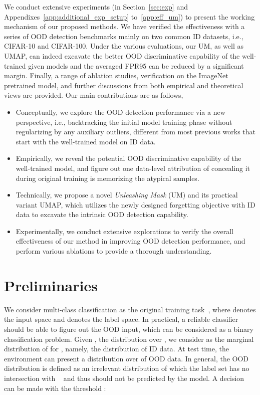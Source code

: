 \documentclass{article}
\theoremstyle{plain}
\theoremstyle{definition}
\theoremstyle{remark}
\begin{document}
We conduct extensive experiments (in Section~\ref{sec:exp} and Appendixes~\ref{app:additional_exp_setup} to~\ref{app:eff_um}) to present the working mechanism of our proposed methods. We have verified the effectiveness with a series of OOD detection benchmarks mainly on two common ID datasets, i.e., CIFAR-10 and CIFAR-100. Under the various evaluations, our UM, as well as UMAP, can indeed excavate the better OOD discriminative capability of the well-trained given models and the averaged FPR95 can be reduced by a significant margin. Finally, a range of ablation studies, verification on the ImageNet pretrained model, and further discussions from both empirical and theoretical views are provided. Our main contributions are as follows,
\begin{itemize}
    \item Conceptually, we explore the OOD detection performance via a new perspective, i.e., backtracking the initial model training phase without regularizing by any auxiliary outliers, different from most previous works that start with the well-trained model on ID data.
    \item Empirically, we reveal the potential OOD discriminative capability of the well-trained model, and figure out one data-level attribution of concealing it during original training is memorizing the atypical samples.
    \item Technically, we propose a novel \textit{Unleashing Mask} (UM) and its practical variant UMAP, which utilizes the newly designed forgetting objective with ID data to excavate the intrinsic OOD detection capability. 
\item Experimentally, we conduct extensive explorations to verify the overall effectiveness of our method in improving OOD detection performance, and perform various ablations to provide a thorough understanding. \end{itemize}






\section{Preliminaries}

We consider multi-class classification as the original training task~\citep{Nguyen_2015_CVPR}, where  denotes the input space and  denotes the label space. In practical, a reliable classifier should be able to figure out the OOD input, which can be considered as a binary classification problem. Given , the distribution over , we consider  as the marginal distribution of  for , namely, the distribution of ID data. At test time, the environment can present a distribution  over  of OOD data. In general, the OOD distribution  is defined as an irrelevant distribution of which the label set has no intersection with ~\cite{yang2021generalized} and thus should not be predicted by the model. A decision can be made with the threshold :
\end{document}
